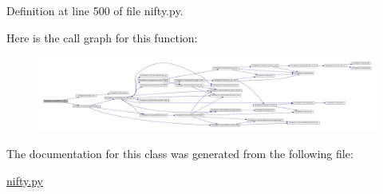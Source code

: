 \-Definition at line 500 of file nifty.\-py.



\-Here is the call graph for this function\-:\nopagebreak
\begin{figure}[H]
\begin{center}
\leavevmode
\includegraphics[width=350pt]{classforcebalance_1_1nifty_1_1Pickler__LP_af59a709f44c96a91c753ce02cff07ae8_cgraph}
\end{center}
\end{figure}




\-The documentation for this class was generated from the following file\-:\begin{DoxyCompactItemize}
\item 
\hyperlink{nifty_8py}{nifty.\-py}\end{DoxyCompactItemize}
